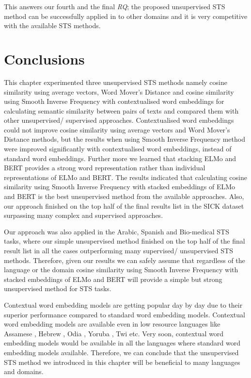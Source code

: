 This answers our fourth and the final \textit{RQ}; the proposed unsupervised STS method can be successfully applied in to other domains and it is very competitive with the available STS methods. 




\section{Conclusions}
\label{sec:state_conclusions}

This chapter experimented three unsupervised STS methods namely cosine similarity using average vectors, Word Mover's Distance and cosine similarity using Smooth Inverse Frequency with contextualised word embeddings for calculating semantic similarity between pairs of texts and compared them with other unsupervised/ supervised approaches. Contextualised word embeddings could not improve cosine similarity using average vectors and Word Mover's Distance methods, but the results when using Smooth Inverse Frequency method were improved significantly with contextualised word embeddings, instead of standard word embeddings. Further more we learned that stacking ELMo and BERT provides a strong word representation rather than individual representations of ELMo and BERT. The results indicated that calculating cosine similarity using Smooth Inverse Frequency with stacked embeddings of ELMo and BERT is the best unsupervised method from the available approaches. Also, our approach finished on the top half of the final results list in the SICK dataset surpassing many complex and supervised approaches. 

Our approach was also applied in the Arabic, Spanish and Bio-medical STS tasks, where our simple unsupervised method finished on the top half of the final result list in all the cases outperforming many supervised/ unsupervised STS methods. Therefore, given our results we can safely assume that regardless of the language or the domain cosine similarity using Smooth Inverse Frequency with stacked embeddings of ELMo and BERT will provide a simple but strong unsupervised method for STS tasks. 

Contextual word embedding models are getting popular day by day due to their superior performance compared to standard word embedding models. Contextual word embedding models are available even in low resource languages like Assamese \cite{kakwani-etal-2020-indicnlpsuite}, Hebrew \cite{chriqui2021hebert}, Odia \cite{kakwani-etal-2020-indicnlpsuite}, Yoruba \cite{alabi-etal-2020-massive}, Twi \cite{alabi-etal-2020-massive} etc. Very soon, contextual word embedding models would be available in all the languages where  standard word embedding models available. Therefore, we can conclude that the unsupervised STS method we introduced in this chapter will be beneficial to many languages and domains. 


